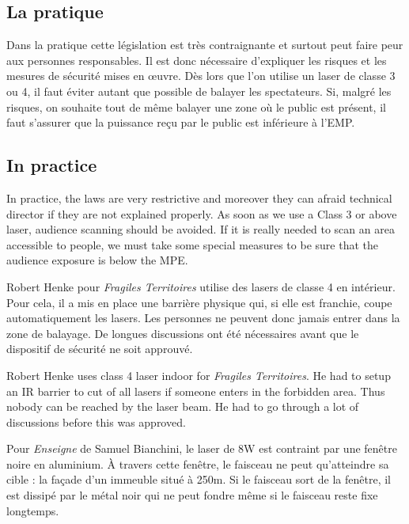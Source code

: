 \begin{appendices}
\begin{en}
\end{en}

\begin{fr}
\subsection*{La pratique}
Dans la pratique cette législation est très contraignante et surtout peut faire peur aux personnes responsables.
Il est donc nécessaire d'expliquer les risques et les mesures de sécurité mises en \oe uvre.
Dès lors que l'on utilise un laser de classe 3 ou 4, il faut éviter autant que possible de balayer les spectateurs.
Si, malgré les risques, on souhaite tout de même balayer une zone où le public est présent, 
il faut s'assurer que la puissance reçu par le public est inférieure à l'EMP.
\end{fr}

\begin{en}
\subsection*{In practice}
In practice, the laws are very restrictive and moreover they can afraid technical director if they are not explained properly.
As soon as we use a Class 3 or above laser, audience scanning should be avoided.
If it is really needed to scan an area accessible to people, we must take some special measures to be sure that the audience exposure is below the MPE.
\end{en}

\begin{fr}
Robert Henke pour \textit{Fragiles Territoires} utilise des lasers de classe 4 en intérieur. 
Pour cela, il a mis en place une barrière physique qui, si elle est franchie, coupe automatiquement les lasers. 
Les personnes ne peuvent donc jamais entrer dans la zone de balayage.
De longues discussions ont été nécessaires avant que le dispositif de sécurité ne soit approuvé.  
\end{fr}

\begin{en}
Robert Henke uses class 4 laser indoor for \textit{Fragiles Territoires}. 
He had to setup an IR barrier to cut of all lasers if someone enters in the forbidden area.
Thus nobody can be reached by the laser beam.
He had to go through a lot of discussions before this was approved.
\end{en}

\begin{fr}
Pour \textit{Enseigne} de Samuel Bianchini, le laser de 8\unit{W} est contraint par une fenêtre noire en aluminium.
À travers cette fenêtre, le faisceau ne peut qu'atteindre sa cible : la façade d'un immeuble situé à 250\unit{m}.
Si le faisceau sort de la fenêtre, il est dissipé par le métal noir qui ne peut fondre même si le faisceau reste fixe longtemps.
\end{fr}


\end{appendices}

